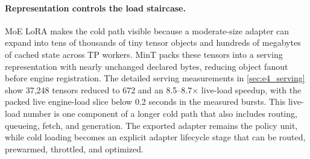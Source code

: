 \paragraph{Representation controls the load staircase.}
MoE LoRA makes the cold path visible because a moderate-size adapter can expand into tens of thousands of tiny tensor objects and hundreds of megabytes of cached state across TP workers. MinT packs these tensors into a serving representation with nearly unchanged declared bytes, reducing object fanout before engine registration. The detailed serving measurements in \cref{sec:e4_serving} show 37{,}248 tensors reduced to 672 and an 8.5--8.7$\times$ live-load speedup, with the packed live engine-load slice below 0.2 seconds in the measured bursts. This live-load number is one component of a longer cold path that also includes routing, queueing, fetch, and generation. The exported adapter remains the policy unit, while cold loading becomes an explicit adapter lifecycle stage that can be routed, prewarmed, throttled, and optimized.

